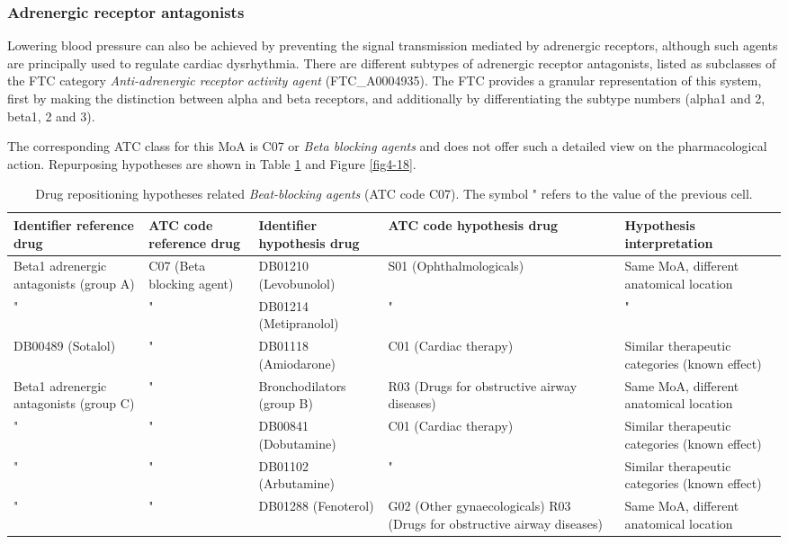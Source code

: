 \subsubsection{Adrenergic receptor antagonists}
Lowering blood pressure can also be achieved by preventing the signal transmission mediated by adrenergic receptors, although such agents are principally used to regulate cardiac dysrhythmia.
There are different subtypes of adrenergic receptor antagonists, listed as subclasses of the FTC category \emph{Anti-adrenergic receptor activity agent} (FTC\_A0004935). The FTC provides a granular representation of this system, first by making the distinction between alpha and beta receptors, and additionally by differentiating the subtype numbers (alpha1 and 2, beta1, 2 and 3).

The corresponding ATC class for this MoA is C07 or \emph{Beta blocking agents} and does not offer such a detailed view on the pharmacological action. Repurposing hypotheses are shown in Table \ref{tab:tablec07} and Figure \ref{fig4-18}.

\begin{table}[htbp]
\scriptsize
\begin{tabular}{|p{2cm}|p{2cm}|p{2cm}|p{3cm}|p{4cm}|}
\hline
\textbf{Identifier reference drug} & \textbf{ATC code reference drug} & \textbf{Identifier hypothesis drug} & \textbf{ATC code hypothesis drug} & \textbf{Hypothesis interpretation} \\ \hline
Beta1 adrenergic antagonists (group A) & C07 (Beta blocking agent) & DB01210 (Levobunolol) & S01 (Ophthalmologicals) & Same MoA, different anatomical location \\ \hline
" & " & DB01214 (Metipranolol) & " & " \\ \hline
DB00489 (Sotalol) & " & DB01118 (Amiodarone) & C01 (Cardiac therapy) & Similar therapeutic categories (known effect) \\ \hline
Beta1 adrenergic antagonists (group C) & " & Bronchodilators (group B) & R03 (Drugs for obstructive airway diseases) & Same MoA, different anatomical location \\ \hline
" & " & DB00841 (Dobutamine) & C01 (Cardiac therapy) & Similar therapeutic categories (known effect) \\ \hline
" & " & DB01102 (Arbutamine) & " & Similar therapeutic categories (known effect) \\ \hline
" & " & DB01288 (Fenoterol) & G02 (Other gynaecologicals)
R03 (Drugs for obstructive airway diseases) & Same MoA, different anatomical location \\ \hline
\end{tabular}
\caption{Drug repositioning hypotheses related \emph{Beat-blocking agents} (ATC code C07). The symbol " refers to the value of the previous cell.}
\label{tab:tablec07}
\end{table}


